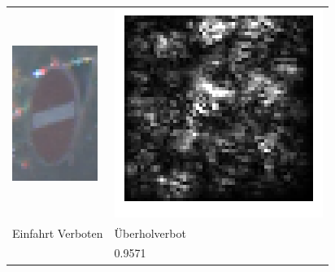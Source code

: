 \begin{tabular}{p{4.4cm}p{4.4cm}}
	\includegraphics[height=4.4cm]{Images/AnPe/06848} &\includegraphics[width=\linewidth]{Images/AnPe/06848_s_int}  \\
	Einfahrt Verboten & Überholverbot\\
	& 0.9571\\

\end{tabular}
